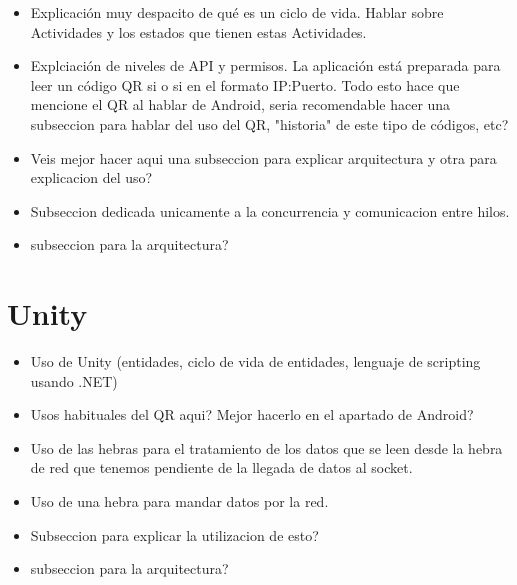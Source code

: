 \begin {itemize}
\item Explicaci\'on muy despacito de qu\'e es un ciclo de vida. Hablar sobre Actividades y los estados que tienen estas Actividades.
\item Explciaci\'on de niveles de API y permisos. La aplicaci\'on est\'a preparada para leer un c\'odigo QR si o si en el formato IP:Puerto. Todo esto hace que mencione el QR al hablar de Android, seria recomendable hacer una subseccion para hablar del uso del QR, "historia" de este tipo de c\'odigos, etc?
\item Veis mejor hacer aqui una subseccion para explicar arquitectura y otra para explicacion del uso?
\item Subseccion dedicada unicamente a la concurrencia y comunicacion entre hilos.
\item subseccion para la arquitectura?
\end {itemize}


\section{Unity}

\begin {itemize}
\item Uso de Unity (entidades, ciclo de vida de entidades, lenguaje de scripting usando .NET)
\item Usos habituales del QR aqui? Mejor hacerlo en el apartado de Android?
\item Uso de las hebras para el tratamiento de los datos que se leen desde la hebra de red que tenemos pendiente de la llegada de datos al socket.
\item Uso de una hebra para mandar datos por la red.
\item Subseccion para explicar la utilizacion de esto?
\item subseccion para la arquitectura?
\end {itemize}


